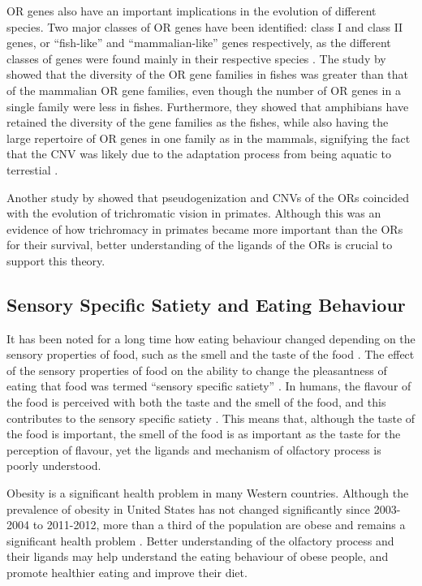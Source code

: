 \documentclass[a4paper, 12pt]{article}
\begin{document}
OR genes also have an important implications in the evolution of different species.
Two major classes of OR genes have been identified: class I and class II genes, or ``fish-like'' and ``mammalian-like'' genes respectively, as the different classes of genes were found mainly in their respective species \citep{Glusman2000}.
The study by \citet{Niimura2005} showed that the diversity of the OR gene families in fishes was greater than that of the mammalian OR gene families, even though the number of OR genes in a single family were less in fishes.
Furthermore, they showed that amphibians have retained the diversity of the gene families as the fishes, while also having the large repertoire of OR genes in one family as in the mammals, signifying the fact that the CNV was likely due to the adaptation process from being aquatic to terrestial \citep{Niimura2005}.

Another study by \citet{Liman2003} showed that pseudogenization and CNVs of the ORs coincided with the evolution of trichromatic vision in primates.
Although this was an evidence of how trichromacy in primates became more important than the ORs for their survival, better understanding of the ligands of the ORs is crucial to support this theory.

\subsection*{Sensory Specific Satiety and Eating Behaviour}

It has been noted for a long time how eating behaviour changed depending on the sensory properties of food, such as the smell and the taste of the food \citep{Rolls1981, Rolls1982}.
The effect of the sensory properties of food on the ability to change the pleasantness of eating that food was termed ``sensory specific satiety'' \citep{Rolls1981}.
In humans, the flavour of the food is perceived with both the taste and the smell of the food, and this contributes to the sensory specific satiety \citep{Rolls2005}.
This means that, although the taste of the food is important, the smell of the food is as important as the taste for the perception of flavour, yet the ligands and mechanism of olfactory process is poorly understood.

Obesity is a significant health problem in many Western countries.
Although the prevalence of obesity in United States has not changed significantly since 2003-2004 to 2011-2012, more than a third of the population are obese and remains a significant health problem \citep{Ogden2014}.
Better understanding of the olfactory process and their ligands may help understand the eating behaviour of obese people, and promote healthier eating and improve their diet.
\end{document}
